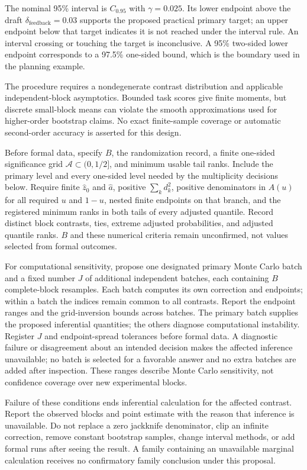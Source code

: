 \documentclass[
  english,
  11pt,
]{article}
\begin{document}
The nominal 95\% interval is \(C_{0.95}\) with \(\gamma=0.025\). Its
lower endpoint above the draft \(\delta_{\mathrm{feedback}}=0.03\)
supports the proposed practical primary target; an upper endpoint below
that target indicates it is not reached under the interval rule. An
interval crossing or touching the target is inconclusive. A 95\%
two-sided lower endpoint corresponds to a 97.5\% one-sided bound, which
is the boundary used in the planning example.

The procedure requires a nondegenerate contrast distribution and
applicable independent-block asymptotics. Bounded task scores give
finite moments, but discrete small-block means can violate the smooth
approximations used for higher-order bootstrap claims. No exact
finite-sample coverage or automatic second-order accuracy is asserted
for this design.

Before formal data, specify \(B\), the randomization record, a finite
one-sided significance grid \(\mathcal A\subset(0,1/2]\), and minimum
usable tail ranks. Include the primary level and every one-sided level
needed by the multiplicity decisions below. Require finite \(\hat z_0\)
and \(\hat a\), positive \(\sum_k d_k^2\), positive denominators in
\(A(u)\) for all required \(u\) and \(1-u\), nested finite endpoints on
that branch, and the registered minimum ranks in both tails of every
adjusted quantile. Record distinct block contrasts, ties, extreme
adjusted probabilities, and adjusted quantile ranks. \(B\) and these
numerical criteria remain unconfirmed, not values selected from formal
outcomes.

For computational sensitivity, propose one designated primary Monte
Carlo batch and a fixed number \(J\) of additional independent batches,
each containing \(B\) complete-block resamples. Each batch computes its
own correction and endpoints; within a batch the indices remain common
to all contrasts. Report the endpoint ranges and the grid-inversion
bounds across batches. The primary batch supplies the proposed
inferential quantities; the others diagnose computational instability.
Register \(J\) and endpoint-spread tolerances before formal data. A
diagnostic failure or disagreement about an intended decision makes the
affected inference unavailable; no batch is selected for a favorable
answer and no extra batches are added after inspection. These ranges
describe Monte Carlo sensitivity, not confidence coverage over new
experimental blocks.

Failure of these conditions ends inferential calculation for the
affected contrast. Report the observed blocks and point estimate with
the reason that inference is unavailable. Do not replace a zero
jackknife denominator, clip an infinite correction, remove constant
bootstrap samples, change interval methods, or add formal runs after
seeing the result. A family containing an unavailable marginal
calculation receives no confirmatory family conclusion under this
proposal.
\end{document}
